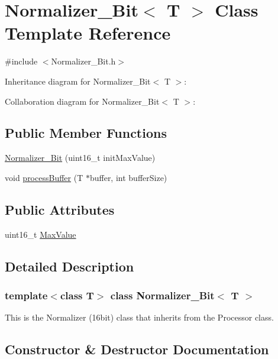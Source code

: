 \hypertarget{classNormalizer__16Bit}{}\section{Normalizer\+\_\+Bit$<$ T $>$ Class Template Reference}
\label{classNormalizer__16Bit}


{\ttfamily \#include $<$Normalizer\+\_\+Bit.\+h$>$}



Inheritance diagram for Normalizer\+\_\+Bit$<$ T $>$\+:


Collaboration diagram for Normalizer\+\_\+Bit$<$ T $>$\+:
\subsection*{Public Member Functions}
\begin{DoxyCompactItemize}
\item 
\hyperlink{classNormalizer__16Bit_aa6dc9ae6659cefb4f1562429c703ac87}{Normalizer\+\_\+Bit} (uint16\+\_\+t init\+Max\+Value)
\item 
void \hyperlink{classNormalizer__16Bit_aa1f13f72888abe2929716c4fe56cdf41}{process\+Buffer} (T $\ast$buffer, int buffer\+Size)
\end{DoxyCompactItemize}
\subsection*{Public Attributes}
\begin{DoxyCompactItemize}
\item 
uint16\+\_\+t \hyperlink{classNormalizer__16Bit_aecbd608e002ccf5af89306bc9add3667}{Max\+Value}
\end{DoxyCompactItemize}


\subsection{Detailed Description}
\subsubsection*{template$<$class T$>$\newline
class Normalizer\+\_\+Bit$<$ T $>$}

This is the Normalizer (16bit) class that inherits from the Processor class. 

\subsection{Constructor \& Destructor Documentation}
\mbox{\label{classNormalizer__16Bit_aa6dc9ae6659cefb4f1562429c703ac87}} 
